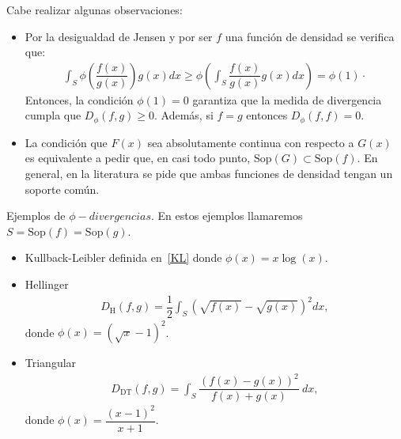 Cabe realizar algunas observaciones:

\begin{itemize}
	\item Por la desigualdad de Jensen y por ser $f$ una función de densidad se verifica que:
	\begin{align}
	\displaystyle \int_{S} \phi\left(\dfrac{f(x)}{g(x)}\right) g(x) dx \geq \phi\left(\int_{S} \dfrac{f(x)}{g(x)} g(x) dx\right)=\phi(1)\cdot
\end{align}
    Entonces, la condición $\phi(1)=0$ garantiza que la medida de divergencia cumpla que $D_{\phi}(f, g) \geq 0.$ Además, si $f=g$ entonces $D_{\phi}(f, f)= 0.$ 
    \item La condición que $F(x)$ sea absolutamente continua con respecto a $G(x)$ es equivalente a pedir que, en casi todo punto, $\mathrm{Sop}(G) \subset \mathrm{Sop}(f).$ En general, en la literatura se pide que ambas funciones de densidad tengan un soporte común.
\end{itemize}

\begin{example} Ejemplos de $\phi-divergencias$. En estos ejemplos llamaremos $S=\mathrm{Sop}(f)=\mathrm{Sop}(g).$
	\begin{itemize}
		\item Kullback-Leibler definida en~\ref{KL} donde $\phi(x)=x \log(x)$.
		\item Hellinger
		\begin{align} 
		D_{\text{H}}(f,g)=\dfrac{1}{2} \displaystyle \int_{S} \left(\sqrt{f(x)}-\sqrt{g(x)}\right)^2 dx,
		\end{align}
		donde $\phi(x)=\left(\sqrt{x}-1\right)^2$.
		\item Triangular
		\begin{align}
		\label{triangular}
		D_{\text{DT}}(f,g)=\displaystyle \int_{S} \dfrac{\left(f(x)-g(x)\right)^2}{f(x)+g(x)} \ dx,
		\end{align}
		donde $\phi(x)=\dfrac{\left(x-1 \right)^2}{x+1}$.
		\end{itemize}
\end{example}

